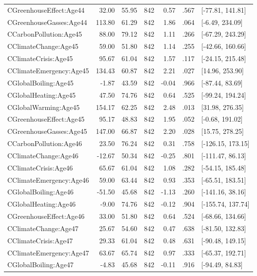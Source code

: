 \begin{table}[ht]
\begin{tabular}{lrrrrrl}
  CGreenhouseEffect:Age44 & 32.00 & 55.95 & 842 & 0.57 & .567 & [-77.81, 141.81] \\ 
  CGreenhouseGasses:Age44 & 113.80 & 61.29 & 842 & 1.86 & .064 & [-6.49, 234.09] \\ 
  CCarbonPollution:Age45 & 88.00 & 79.12 & 842 & 1.11 & .266 & [-67.29, 243.29] \\ 
  CClimateChange:Age45 & 59.00 & 51.80 & 842 & 1.14 & .255 & [-42.66, 160.66] \\ 
  CClimateCrisis:Age45 & 95.67 & 61.04 & 842 & 1.57 & .117 & [-24.15, 215.48] \\ 
  CClimateEmergency:Age45 & 134.43 & 60.87 & 842 & 2.21 & .027 & [14.96, 253.90] \\ 
  CGlobalBoiling:Age45 & -1.87 & 43.59 & 842 & -0.04 & .966 & [-87.44, 83.69] \\ 
  CGlobalHeating:Age45 & 47.50 & 74.76 & 842 & 0.64 & .525 & [-99.24, 194.24] \\ 
  CGlobalWarming:Age45 & 154.17 & 62.25 & 842 & 2.48 & .013 & [31.98, 276.35] \\ 
  CGreenhouseEffect:Age45 & 95.17 & 48.83 & 842 & 1.95 & .052 & [-0.68, 191.02] \\ 
  CGreenhouseGasses:Age45 & 147.00 & 66.87 & 842 & 2.20 & .028 & [15.75, 278.25] \\ 
  CCarbonPollution:Age46 & 23.50 & 76.24 & 842 & 0.31 & .758 & [-126.15, 173.15] \\ 
  CClimateChange:Age46 & -12.67 & 50.34 & 842 & -0.25 & .801 & [-111.47, 86.13] \\ 
  CClimateCrisis:Age46 & 65.67 & 61.04 & 842 & 1.08 & .282 & [-54.15, 185.48] \\ 
  CClimateEmergency:Age46 & 59.00 & 63.44 & 842 & 0.93 & .353 & [-65.51, 183.51] \\ 
  CGlobalBoiling:Age46 & -51.50 & 45.68 & 842 & -1.13 & .260 & [-141.16, 38.16] \\ 
  CGlobalHeating:Age46 & -9.00 & 74.76 & 842 & -0.12 & .904 & [-155.74, 137.74] \\ 
  CGreenhouseEffect:Age46 & 33.00 & 51.80 & 842 & 0.64 & .524 & [-68.66, 134.66] \\ 
  CClimateChange:Age47 & 25.67 & 54.60 & 842 & 0.47 & .638 & [-81.50, 132.83] \\ 
  CClimateCrisis:Age47 & 29.33 & 61.04 & 842 & 0.48 & .631 & [-90.48, 149.15] \\ 
  CClimateEmergency:Age47 & 63.67 & 65.74 & 842 & 0.97 & .333 & [-65.37, 192.71] \\ 
  CGlobalBoiling:Age47 & -4.83 & 45.68 & 842 & -0.11 & .916 & [-94.49, 84.83] \\ 

\end{tabular}
\end{table}
